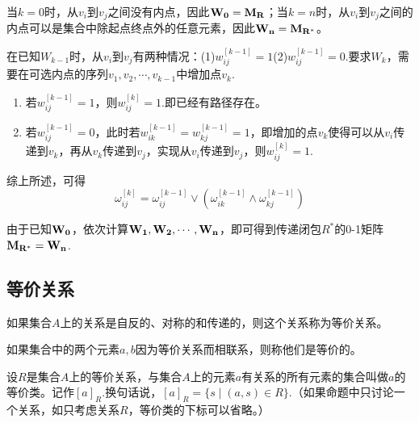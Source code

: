 当$k=0$时，从$v_i$到$v_j$之间没有内点，因此$\bf W_0 = M_R$；当$k=n$时，从$v_i$到$v_j$之间的内点可以是集合中除起点终点外的任意元素，因此$\bf W_n = M_{R^*}$。

在已知$W_{k-1}$时，从$v_i$到$v_j$有两种情况：(1)$w _{ij}^{[k-1]}=1$(2)$w _{ij}^{[k-1]}=0$.要求$W_k$，需要在可选内点的序列$v_1, v_2, \cdots, v_{k-1}$中增加点$v_k$.
    \begin{enumerate}
        \item 若$w _{ij}^{[k-1]} = 1$，则$w _{ij}^{[k]}=1$.即已经有路径存在。
        \item 若$w _{ij}^{[k-1]} = 0$，此时若$w _{ik}^{[k-1]} = w _{kj}^{[k-1]} = 1$，即增加的点$v_k$使得可以从$v_i$传递到$v_k$，再从$v_k$传递到$v_j$，实现从$v_i$传递到$v_j$，则$w _{ij}^{[k]} = 1$.
    \end{enumerate}
综上所述，可得
\[ \omega _{ij}^{[k]} = \omega _{ij}^{[k-1]} \vee (\omega _{ik}^{[k-1]} \wedge \omega _{kj}^{[k-1]}) \]

由于已知$\bf W_0$，依次计算$\bf W_1, \bf W_2, \cdots, \bf W_n$，即可得到传递闭包$R^*$的0-1矩阵$\bf M_{R^*} = \bf W_n$.

\subsection{等价关系}
如果集合$A$上的关系是自反的、对称的和传递的，则这个关系称为等价关系。

如果集合中的两个元素$a,b$因为等价关系而相联系，则称他们是等价的。

设$R$是集合$A$上的等价关系，与集合$A$上的元素$a$有关系的所有元素的集合叫做$a$的等价类。记作$[a]_R$.换句话说，$[a]_R = \{s \mid (a,s) \in R\}$.（如果命题中只讨论一个关系，如只考虑关系$R$，等价类的下标可以省略。）

